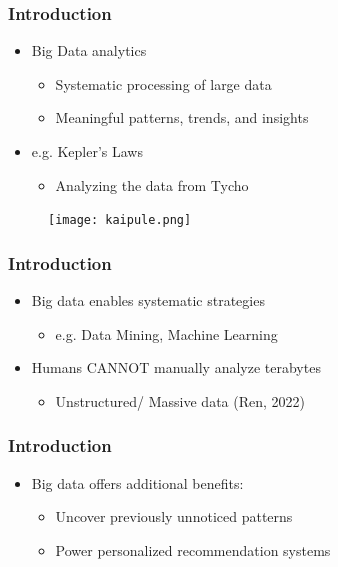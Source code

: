 \documentclass{beamer}
\begin{document}
\begin{frame}
 \frametitle{Introduction}
\begin{minipage}{\textwidth}
{\linespread{1.5}
\begin{itemize}
\item <1-> {\Large Big Data analytics}
    \begin{itemize}
        \item {\large Systematic processing of large data}
        \item {\large Meaningful patterns, trends, and insights}
    \end{itemize}
\item <2-> {\Large e.g. Kepler's Laws}
    \begin{itemize}
        \item {\large Analyzing the data from Tycho} 
    \end{itemize}
\end{itemize}
\begin{figure}
    \centering
    \texttt{[image: kaipule.png]}
    \label{fig:enter-label}
\end{figure}
}
\end{minipage}
\end{frame}


\begin{frame}
 \frametitle{Introduction}
\begin{minipage}{\textwidth}
{\linespread{2}
\begin{itemize}
\item <1-> {\LARGE Big data enables systematic strategies}
    \begin{itemize}
        \item {\Large e.g. Data Mining, Machine Learning}
    \end{itemize}
\item <2-> {\LARGE Humans CANNOT manually analyze terabytes}
    \begin{itemize}
        \item {\Large Unstructured/ Massive data} (Ren, 2022)
    \end{itemize}
\end{itemize}
}
\end{minipage}
\end{frame}


\begin{frame}
 \frametitle{Introduction}
\begin{minipage}{\textwidth}
{\linespread{2}
\begin{itemize}
    \item {\LARGE Big data offers additional benefits:}
    \begin{itemize}
        \item <1-> {\Large Uncover previously unnoticed patterns}
        \item <2-> {\Large Power personalized recommendation systems}
    \end{itemize}
\end{itemize}
}
\end{minipage}
\end{frame}
\end{document}
